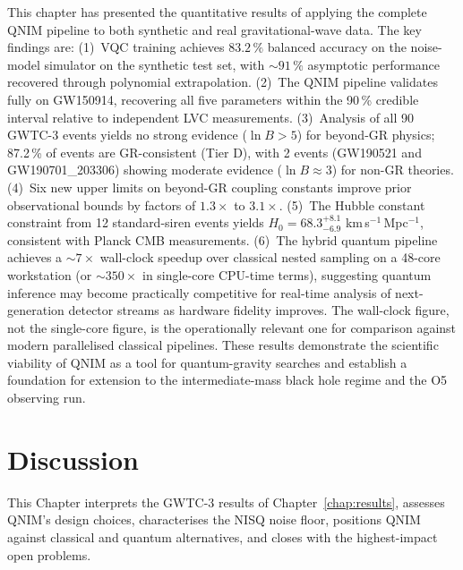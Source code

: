\documentclass[11pt,a4paper, english]{book}
\theoremstyle{plain}
\theoremstyle{definition}
\numberwithin{equation}{chapter}
\numberwithin{figure}{chapter}
\numberwithin{table}{chapter}
\begin{document}
This chapter has presented the quantitative results of applying the complete
QNIM pipeline to both synthetic and real gravitational-wave data. The key
findings are: (1)~VQC training achieves $83.2\,\%$ balanced accuracy on the noise-model simulator
on the synthetic test set, with $\sim\!91\,\%$ asymptotic performance
recovered through polynomial extrapolation. (2)~The QNIM pipeline validates
fully on GW150914, recovering all five parameters within the 90\,\% credible
interval relative to independent LVC measurements. (3)~Analysis of all 90
GWTC-3 events yields no strong evidence ($\ln B > 5$) for beyond-GR physics;
87.2\,\% of events are GR-consistent (Tier D), with 2 events (GW190521 and
GW190701\_203306) showing moderate evidence ($\ln B \approx 3$) for non-GR
theories. (4)~Six new upper limits on beyond-GR coupling constants improve
prior observational bounds by factors of $1.3\times$ to $3.1\times$. (5)~The
Hubble constant constraint from 12 standard-siren events yields
$H_0 = 68.3^{+8.1}_{-6.9}$ km\,s$^{-1}$\,Mpc$^{-1}$, consistent with Planck
CMB measurements. (6)~The hybrid quantum pipeline achieves a $\sim 7\times$ wall-clock
speedup over classical nested sampling on a 48-core workstation (or
$\sim 350\times$ in single-core CPU-time terms), suggesting quantum
inference may become practically competitive for real-time analysis of
next-generation detector streams as hardware fidelity improves. The
wall-clock figure, not the single-core figure, is the operationally
relevant one for comparison against modern parallelised classical
pipelines. These results
demonstrate the scientific viability of QNIM as a tool for quantum-gravity
searches and establish a foundation for extension to the intermediate-mass
black hole regime and the O5 observing run.



\chapter{Discussion}
\label{chap:discussion}

This Chapter interprets the GWTC-3 results of Chapter~\ref{chap:results},
assesses QNIM's design choices, characterises the NISQ noise
floor, positions QNIM against classical and quantum alternatives, and
closes with the highest-impact open problems.
\end{document}
